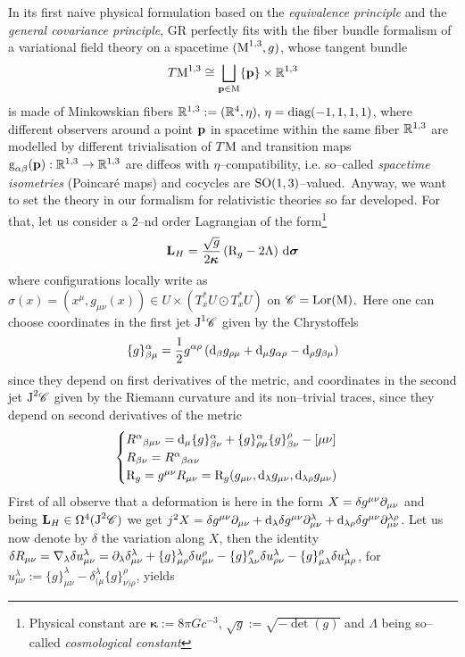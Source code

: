  In its first naive physical formulation based on the \emph{equivalence principle} and the \emph{general covariance principle}, GR perfectly fits with the fiber bundle formalism of a variational field theory on a spacetime $(\text{\normalfont M}^{1,3},g)$, whose tangent bundle
$$T\text{\normalfont M}^{1,3}\cong\bigsqcup_{\mathbf{p}\in\text{\normalfont M}}\{\mathbf{p}\}\times\mathbb{R}^{1,3}$$
is made of Minkowskian fibers $\mathbb{R}^{1,3}:=(\mathbb{R}^4,\eta),\,\eta=\text{\normalfont diag}(-1,1,1,1)$, where different observers around a point $\mathbf{p}$ in spacetime within the same fiber $\mathbb{R}^{1,3}$ are modelled by different trivialisation of $T\text{\normalfont M}$ and transition maps $\text{\normalfont g}_{\alpha\beta}(\mathbf{p}):\mathbb{R}^{1,3}\to\mathbb{R}^{1,3}$ are diffeos with $\eta$--compatibility, i.e. so--called \emph{spacetime isometries} (Poincaré maps) and cocycles are $\text{\normalfont SO}(1,3)$--valued.\, Anyway, we want to set the theory in our formalism for relativistic theories so far developed. For that, let us consider a $2$--nd order Lagrangian of the form\footnote{Physical constant are $\boldsymbol{\kappa}:=8\pi Gc^{-3}$, $\sqrt{g}:=\sqrt{-\det(g)}$ and $\Lambda$ being so--called \emph{cosmological constant}}
$$\mathbf{L}_H=\frac{\sqrt{g}}{2\boldsymbol{\kappa}}\left(\text{\normalfont R}_g-2\Lambda\right)\,\text{\normalfont d}\boldsymbol{\sigma}$$
where configurations locally write as $\sigma(x)=\left(x^\mu,g_{\mu\nu}(x)\right)\in U\times\left(T^*_xU\odot T^*_xU\right)$ on $\mathscr{C}=\text{\normalfont Lor}(\text{\normalfont M})$.\, Here one can choose coordinates in the first jet $\text{\normalfont J}^1\mathscr{C}$ given by the Chrystoffels 
$$\{g\}^\alpha_{\beta\mu}=\frac{1}{2}g^{\alpha\rho}\left(\text{\normalfont d}_\beta g_{\rho\mu}+\text{\normalfont d}_\mu g_{\alpha\rho}-\text{\normalfont d}_\rho g_{\beta\mu}\right)$$
since they depend on first derivatives of the metric, and coordinates in the second jet $\text{\normalfont J}^2\mathscr{C}$ given by the Riemann curvature and its non--trivial traces, since they depend on second derivatives of the metric
$$\begin{cases}
    {R^\alpha}_{\beta\mu\nu}=\text{\normalfont d}_\mu\{g\}^\alpha_{\beta\nu}+\{g\}^\alpha_{\rho\mu}\{g\}^\rho_{\beta\nu}-[\mu\nu]\\
    R_{\beta\nu}={R^\alpha}_{\beta\alpha\nu}\\
    \text{\normalfont R}_g=g^{\mu\nu}R_{\mu\nu}=\text{\normalfont R}_g(g_{\mu\nu},\text{\normalfont d}_\lambda g_{\mu\nu},\text{\normalfont d}_{\lambda\rho}g_{\mu\nu})
\end{cases}$$
 First of all observe that a deformation is here in the form $X=\delta g^{\mu\nu}\partial_{\mu\nu}$ and being $\mathbf{L}_H\in\Omega^4(\text{\normalfont J}^2\mathscr{C})$ we get $j^2X=\delta g^{\mu\nu}\partial_{\mu\nu}+\text{\normalfont d}_\lambda\delta g^{\mu\nu}\partial_{\mu\nu}^\lambda+\text{\normalfont d}_{\lambda\rho}\delta g^{\mu\nu}\partial_{\mu\nu}^{\lambda\rho}$. Let us now denote by $\delta$ the variation along $X$, then the identity $\delta R_{\mu\nu}=\nabla_\lambda\delta u^\lambda_{\mu\nu}=\partial_\lambda\delta_{\mu\nu}^\lambda+\{g\}^\lambda_{\mu\rho}\delta u^\rho_{\mu\nu}-\{g\}^\rho_{\lambda\nu}\delta u^\lambda_{\rho\nu}-\{g\}^\rho_{\mu\lambda}\delta u^\lambda_{\mu\rho}$, for $u^\lambda_{\mu\nu}:=\{g\}^\lambda_{\mu\nu}-\delta^\lambda_{(\mu}\{g\}^\rho_{\nu)\rho}$, yields
